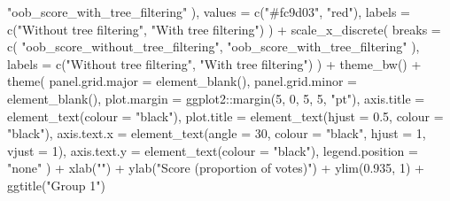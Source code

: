 \documentclass[
  11pt,
  oneside]{book}
\newenvironment{Shaded}{\begin{snugshade}}{\end{snugshade}}
\newcommand{\AttributeTok}[1]{\textcolor[rgb]{0.77,0.63,0.00}{#1}}
\newcommand{\DecValTok}[1]{\textcolor[rgb]{0.00,0.00,0.81}{#1}}
\newcommand{\FloatTok}[1]{\textcolor[rgb]{0.00,0.00,0.81}{#1}}
\newcommand{\FunctionTok}[1]{\textcolor[rgb]{0.00,0.00,0.00}{#1}}
\newcommand{\NormalTok}[1]{#1}
\newcommand{\SpecialCharTok}[1]{\textcolor[rgb]{0.00,0.00,0.00}{#1}}
\newcommand{\StringTok}[1]{\textcolor[rgb]{0.31,0.60,0.02}{#1}}
\begin{document}
\begin{Shaded}
\begin{Highlighting}[]
      \StringTok{"oob\_score\_with\_tree\_filtering"}
\NormalTok{    ),}
    \AttributeTok{values =} \FunctionTok{c}\NormalTok{(}\StringTok{"\#fc9d03"}\NormalTok{, }\StringTok{"red"}\NormalTok{),}
    \AttributeTok{labels =} \FunctionTok{c}\NormalTok{(}\StringTok{"Without tree filtering"}\NormalTok{, }\StringTok{"With tree filtering"}\NormalTok{)}
\NormalTok{  ) }\SpecialCharTok{+}
  \FunctionTok{scale\_x\_discrete}\NormalTok{(}
    \AttributeTok{breaks =} \FunctionTok{c}\NormalTok{(}
      \StringTok{"oob\_score\_without\_tree\_filtering"}\NormalTok{,}
      \StringTok{"oob\_score\_with\_tree\_filtering"}
\NormalTok{    ),}
    \AttributeTok{labels =} \FunctionTok{c}\NormalTok{(}\StringTok{"Without tree filtering"}\NormalTok{, }\StringTok{"With tree filtering"}\NormalTok{)}
\NormalTok{  ) }\SpecialCharTok{+}
  \FunctionTok{theme\_bw}\NormalTok{() }\SpecialCharTok{+}
  \FunctionTok{theme}\NormalTok{(}
    \AttributeTok{panel.grid.major =} \FunctionTok{element\_blank}\NormalTok{(),}
    \AttributeTok{panel.grid.minor =} \FunctionTok{element\_blank}\NormalTok{(),}
    \AttributeTok{plot.margin =}\NormalTok{ ggplot2}\SpecialCharTok{::}\FunctionTok{margin}\NormalTok{(}\DecValTok{5}\NormalTok{, }\DecValTok{0}\NormalTok{, }\DecValTok{5}\NormalTok{, }\DecValTok{5}\NormalTok{, }\StringTok{"pt"}\NormalTok{),}
    \AttributeTok{axis.title =} \FunctionTok{element\_text}\NormalTok{(}\AttributeTok{colour =} \StringTok{"black"}\NormalTok{),}
    \AttributeTok{plot.title =} \FunctionTok{element\_text}\NormalTok{(}\AttributeTok{hjust =} \FloatTok{0.5}\NormalTok{, }\AttributeTok{colour =} \StringTok{"black"}\NormalTok{),}
    \AttributeTok{axis.text.x =} \FunctionTok{element\_text}\NormalTok{(}\AttributeTok{angle =} \DecValTok{30}\NormalTok{, }\AttributeTok{colour =} \StringTok{"black"}\NormalTok{, }\AttributeTok{hjust =} \DecValTok{1}\NormalTok{, }\AttributeTok{vjust =} \DecValTok{1}\NormalTok{),}
    \AttributeTok{axis.text.y =} \FunctionTok{element\_text}\NormalTok{(}\AttributeTok{colour =} \StringTok{"black"}\NormalTok{),}
    \AttributeTok{legend.position =} \StringTok{"none"}
\NormalTok{  ) }\SpecialCharTok{+}
  \FunctionTok{xlab}\NormalTok{(}\StringTok{""}\NormalTok{) }\SpecialCharTok{+}
  \FunctionTok{ylab}\NormalTok{(}\StringTok{"Score (proportion of votes)"}\NormalTok{) }\SpecialCharTok{+}
  \FunctionTok{ylim}\NormalTok{(}\FloatTok{0.935}\NormalTok{, }\DecValTok{1}\NormalTok{) }\SpecialCharTok{+}
  \FunctionTok{ggtitle}\NormalTok{(}\StringTok{"Group 1"}\NormalTok{)}


\end{Highlighting}
\end{Shaded}
\end{document}
